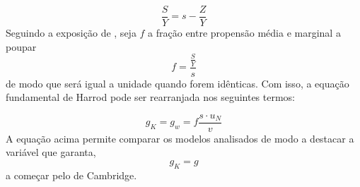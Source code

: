 \begin{equation}
\label{Poupanca_Super}
    \frac{S}{Y} = s - \frac{Z}{Y}
\end{equation}
Seguindo a exposição de \textcite{serrano_sraffian_1995}, seja $f$ a fração entre propensão média e marginal a poupar
$$
f = \frac{\frac{S}{Y}}{s}
$$
de modo que será igual a unidade quando forem idênticas. 
Com isso, a equação fundamental de Harrod pode ser rearranjada nos seguintes termos:

\begin{equation}
 \label{EqGeral}   
g_K = g_w = f\frac{s\cdot u_N}{v}
\end{equation}
A equação acima permite comparar os modelos analisados de modo a destacar a variável que garanta, 
$$
g_K = g
$$
a começar pelo de Cambridge.
